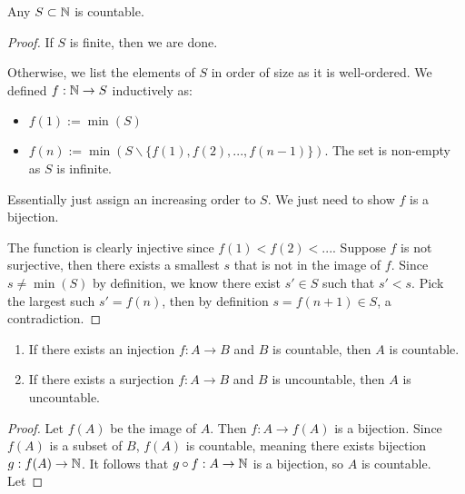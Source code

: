 \documentclass[11pt]{article}
\begin{document}
\begin{proposition}
  Any \(S \subset \mathbb{N}\) is countable.
\end{proposition}
\begin{proof}
  If \(S\) is finite, then we are done.

  Otherwise, we list the elements of \(S\) in order of size as it is well-ordered. We defined \(f:\mathbb{N} \to S\) inductively as:
  \begin{itemize}
    \item \(f(1):=\min(S)\)
    \item \(f(n):=\min(S\backslash\{f(1),f(2),...,f(n-1)\})\). The set is non-empty as \(S\) is infinite.
  \end{itemize}
  Essentially just assign an increasing order to \(S\). We just need to show \(f\) is a bijection.

  The function is clearly injective since \(f(1)<f(2)<...\). Suppose \(f\) is not surjective, then there exists a smallest \(s\) that is not in the image of \(f\). Since \(s\neq \min(S)\) by definition, we know there exist \(s'\in S\) such that \(s'<s\). Pick the largest such \(s'=f(n)\), then by definition \(s=f(n+1) \in S\), a contradiction.
\end{proof}

\begin{proposition}[][CountFunc]
  \begin{enumerate}
    \item If there exists an injection \(f:A\to B\) and \(B\) is countable, then \(A\) is countable.
    \item If there exists a surjection \(f:A\to B\) and \(B\) is uncountable, then \(A\) is uncountable.
  \end{enumerate}
\end{proposition}
\begin{proof}
  \subproof{}
  Let \(f(A)\) be the image of \(A\). Then \(f:A\to f(A)\) is a bijection. Since \(f(A)\) is a subset of \(B\), \(f(A)\) is countable, meaning there exists bijection \(g:f(A)\to \mathbb{N}\). It follows that \(g\circ f:A\to \mathbb{N}\) is a bijection, so \(A\) is countable.
  \subproof{}
  Let %
\end{proof}
\end{document}
